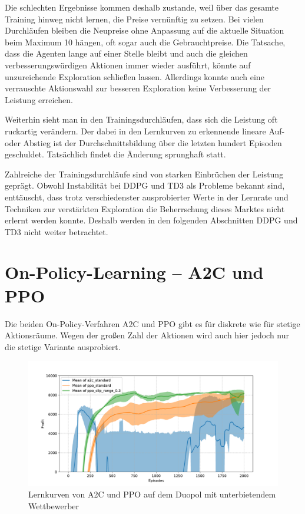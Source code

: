 Die schlechten Ergebnisse kommen deshalb zustande, weil über das gesamte Training hinweg nicht lernen, die Preise vernünftig zu setzen.
Bei vielen Durchläufen bleiben die Neupreise ohne Anpassung auf die aktuelle Situation beim Maximum 10 hängen, oft sogar auch die Gebrauchtpreise.
Die Tatsache, dass die Agenten lange auf einer Stelle bleibt und auch die gleichen verbesserungswürdigen Aktionen immer wieder ausführt, könnte auf unzureichende Exploration schließen lassen.
Allerdings konnte auch eine verrauschte Aktionswahl zur besseren Exploration keine Verbesserung der Leistung erreichen.

Weiterhin sieht man in den Trainingsdurchläufen, dass sich die Leistung oft ruckartig verändern.
Der dabei in den Lernkurven zu erkennende lineare Auf- oder Abstieg ist der Durchschnittsbildung über die letzten hundert Episoden geschuldet.
Tatsächlich findet die Änderung sprunghaft statt.

Zahlreiche der Trainingsdurchläufe sind von starken Einbrüchen der Leistung geprägt.
Obwohl Instabilität bei DDPG und TD3 als Probleme bekannt sind, enttäuscht, dass trotz verschiedenster ausprobierter Werte in der Lernrate und Techniken zur verstärkten Exploration die Beherrschung dieses Marktes nicht erlernt werden konnte.
Deshalb werden in den folgenden Abschnitten DDPG und TD3 nicht weiter betrachtet.

\section{On-Policy-Learning -- A2C und PPO}
\label{section:main_ppo}
Die beiden On-Policy-Verfahren A2C und PPO gibt es für diskrete wie für stetige Aktionsräume.
Wegen der großen Zahl der Aktionen wird auch hier jedoch nur die stetige Variante ausprobiert.

\begin{figure}[htbp]
	\centering
	\includegraphics[width=\textwidth]{main/a2c_vs_ppo.pdf}
	\caption{Lernkurven von A2C und PPO auf dem Duopol mit unterbietendem Wettbewerber}
	\label{graphic:OnPolicyLearningCurves}
\end{figure}

